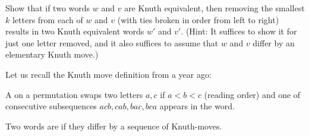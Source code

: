 \documentclass[12pt]{memoir}
\begin{document}
\iffalse
\begin{Ej}[1]
    Consider a word of 1's and 2's. Show that if we remove a 2 from this word, then at most
one 1 that was bracketed becomes unbracketed, and all other 1's retain their status (of being bracketed
with some 2 or not). This was shown with mountain graphs on the board; write out a proof carefully.
\end{Ej}

\begin{ptcbr}
    We analyze the following cases:
    \begin{itemize}
        \item If there's no $1$'s after our removed $2$, then no $1$ becomes unbracketed.
        \item If there was at least one $1$ after our $2$
    \end{itemize}
\end{ptcbr}
\fi

\begin{Ej}[7(a)]
    Show that if two words $w$ and $v$ are Knuth equivalent, then removing the smallest $k$
    letters from each of $w$ and $v$ (with ties broken in order from left to right) results in two Knuth
    equivalent words $w'$ and $v'$. (Hint: It suffices to show it for just one letter removed, and it also
    suffices to assume that $w$ and $v$ differ by an elementary Knuth move.)
\end{Ej}

Let us recall the Knuth move definition from a year ago:

\begin{Def}
    A  on a permutation swaps two letters $a,c$ if $a<b<c$ (reading order) and one of consecutive subsequences $acb,cab,bac,bca$ appears in the word.\par 
    Two words are  if they differ by a sequence of Knuth-moves.
\end{Def}
\end{document}
